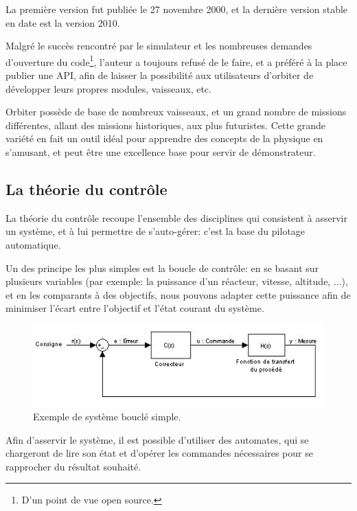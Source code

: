 \documentclass[a4paper,11pt]{article}
\begin{document}
        La première version fut publiée le 27 novembre 2000, et la dernière version stable en date est la version 2010.

        Malgré le succès rencontré par le simulateur et les nombreuses demandes d'ouverture du code\footnote{D'un point de vue open source.}, l'auteur a toujours refusé de le faire, et a préféré à la place publier une API, afin de laisser la possibilité aux utilisateurs d'orbiter de développer leurs propres modules, vaisseaux, etc.

        Orbiter possède de base de nombreux vaisseaux, et un grand nombre de missions différentes, allant des missions historiques, aux plus futuristes. Cette grande variété en fait un outil idéal pour apprendre des concepts de la physique en s'amusant, et peut être une excellence base pour servir de démonstrateur.

    \subsection{La théorie du contrôle}
        La théorie du contrôle recoupe l'ensemble des disciplines qui consistent à asservir un système, et à lui permettre de s'auto-gérer: c'est la base du pilotage automatique.

        Un des principe les plus simples est la boucle de contrôle: en se basant sur plusieurs variables (par exemple: la puissance d'un réacteur, vitesse, altitude, ...), et en les comparants à des objectifs, nous pouvons adapter cette puissance afin de minimiser l'écart entre l'objectif et l'état courant du système.

        \begin{figure}[!h]
            \begin{center}
                \includegraphics[width=1\textwidth]{img/boucle_controle.jpg}
                \caption{Exemple de système bouclé simple.}
            \end{center}
        \end{figure}
        
        Afin d'asservir le système, il est possible d'utiliser des automates, qui se chargeront de lire son état et d'opérer les commandes nécessaires pour se rapprocher du résultat souhaité.
\end{document}
